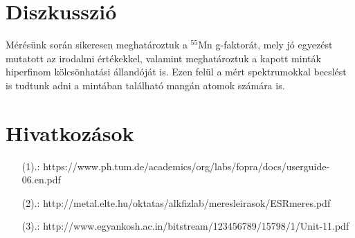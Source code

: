 \documentclass[12pt,a4paper]{article}
\begin{document}
\section{Diszkusszió}
\hspace*{10pt} Mérésünk során sikeresen meghatároztuk a $^{55}$Mn g-faktorát, mely jó egyezést mutatott az irodalmi értékekkel, valamint meghatároztuk a kapott minták hiperfinom kölcsönhatási állandóját is. Ezen felül a mért spektrumokkal becslést is tudtunk adni a mintában található mangán atomok számára is.

\section*{Hivatkozások}
\begin{itemize}
\item[(1).:] {https://www.ph.tum.de/academics/org/labs/fopra/docs/userguide-06.en.pdf}
\item[(2).:] {http://metal.elte.hu/oktatas/alkfizlab/meresleirasok/ESRmeres.pdf}
\item[(3).:] {http://www.egyankosh.ac.in/bitstream/123456789/15798/1/Unit-11.pdf}
\end{itemize}
\end{document}

